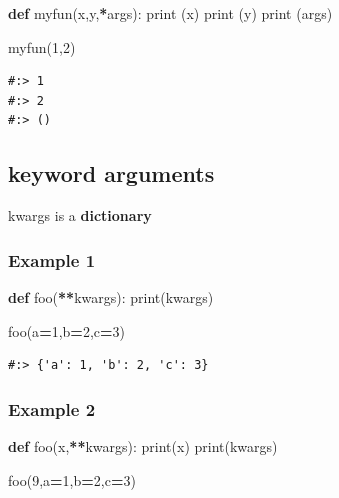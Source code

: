 \documentclass[
]{book}
\newenvironment{Shaded}{\begin{snugshade}}{\end{snugshade}}
\newcommand{\BuiltInTok}[1]{#1}
\newcommand{\DecValTok}[1]{\textcolor[rgb]{0.06,0.06,0.06}{#1}}
\newcommand{\KeywordTok}[1]{\textcolor[rgb]{0.27,0.27,0.27}{\textbf{#1}}}
\newcommand{\NormalTok}[1]{#1}
\newcommand{\OperatorTok}[1]{\textcolor[rgb]{0.43,0.43,0.43}{\textbf{#1}}}
\begin{document}
\begin{Shaded}
\begin{Highlighting}[]
\KeywordTok{def}\NormalTok{ myfun(x,y,}\OperatorTok{*}\NormalTok{args):}
    \BuiltInTok{print}\NormalTok{ (x)}
    \BuiltInTok{print}\NormalTok{ (y)}
    \BuiltInTok{print}\NormalTok{ (args)}
    
\NormalTok{myfun(}\DecValTok{1}\NormalTok{,}\DecValTok{2}\NormalTok{)}
\end{Highlighting}
\end{Shaded}

\begin{verbatim}
#:> 1
#:> 2
#:> ()
\end{verbatim}

\hypertarget{keyword-arguments}{%
\subsection{keyword arguments}\label{keyword-arguments}}

kwargs is a \textbf{dictionary}

\hypertarget{example-1-1}{%
\subsubsection{Example 1}\label{example-1-1}}

\begin{Shaded}
\begin{Highlighting}[]
\KeywordTok{def}\NormalTok{ foo(}\OperatorTok{**}\NormalTok{kwargs):}
    \BuiltInTok{print}\NormalTok{(kwargs)}
    
\NormalTok{foo(a}\OperatorTok{=}\DecValTok{1}\NormalTok{,b}\OperatorTok{=}\DecValTok{2}\NormalTok{,c}\OperatorTok{=}\DecValTok{3}\NormalTok{)}
\end{Highlighting}
\end{Shaded}

\begin{verbatim}
#:> {'a': 1, 'b': 2, 'c': 3}
\end{verbatim}

\hypertarget{example-2-1}{%
\subsubsection{Example 2}\label{example-2-1}}

\begin{Shaded}
\begin{Highlighting}[]
\KeywordTok{def}\NormalTok{ foo(x,}\OperatorTok{**}\NormalTok{kwargs):}
    \BuiltInTok{print}\NormalTok{(x)}
    \BuiltInTok{print}\NormalTok{(kwargs)}
    
\NormalTok{foo(}\DecValTok{9}\NormalTok{,a}\OperatorTok{=}\DecValTok{1}\NormalTok{,b}\OperatorTok{=}\DecValTok{2}\NormalTok{,c}\OperatorTok{=}\DecValTok{3}\NormalTok{)}
\end{Highlighting}
\end{Shaded}
\end{document}
